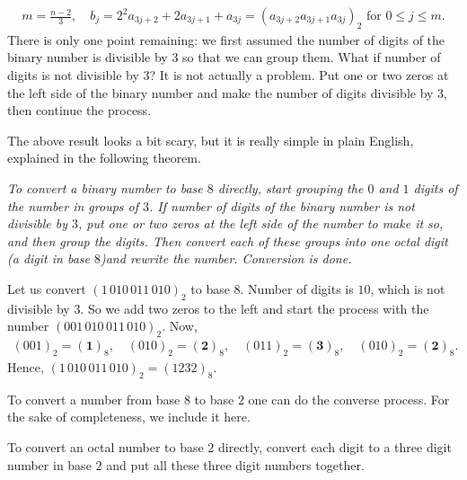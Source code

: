 \documentclass{subfile}
\begin{document}
	\begin{align*}
		m=\frac{n-2}{3}, \quad b_j = 2^2a_{3j+2} + 2a_{3j+1} + a_{3j} = (a_{3j+2}a_{3j+1}a_{3j})_2 \text{ for } 0 \leq j \leq m.
	\end{align*}
	There is only one point remaining: we first assumed the number of digits of the binary number is divisible by $3$ so that we can group them. What if number of digits is not divisible by $3$? It is not actually a problem. Put one or two zeros at the left side of the binary number and make the number of digits divisible by $3$, then continue the process.

	The above result looks a bit scary, but it is really simple in plain English, explained in the following theorem.

	\begin{theorem}\slshape
		To convert a binary number to base $8$ directly, start grouping the $0$ and $1$ digits of the number in groups of $3$. If number of digits of the binary number is not divisible by $3$, put one or two zeros at the left side of the number to make it so, and then group the digits. Then convert each of these groups into one octal digit (a digit in base $8$)and rewrite the number. Conversion is done.
	\end{theorem}

	\begin{example}
		Let us convert $({1\,010\,011\,010})_2$ to base $8$. Number of digits is $10$, which is not divisible by $3$. So we add two zeros to the left and start the process with the number $({001\,010\,011\,010})_2$. Now,
		\begin{align*}
			({001})_2 = (\textbf{1})_8, \quad ({010})_2 = (\textbf{2})_8,  \quad ({011})_2 = (\textbf{3})_8, \quad ({010})_2 = (\textbf{2})_8.
		\end{align*}
		Hence, $({1\,010\,011\,010})_2 = ({1232})_8$.
	\end{example}
	To convert a number from base $8$ to base $2$ one can do the converse process. For the sake of completeness, we include it here.
	\begin{theorem}
		To convert an octal number to base $2$ directly, convert each digit to a three digit number in base $2$ and put all these three digit numbers together.
	\end{theorem}
\end{document}
